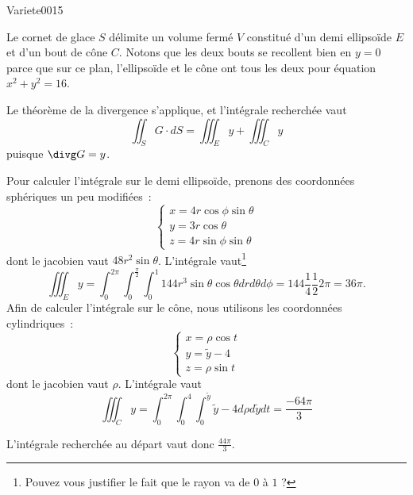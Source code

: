 
\begin{corrige}{Variete0015}

Le cornet de glace $S$ délimite un volume fermé $V$ constitué d'un demi ellipsoïde $E$ et d'un bout de cône $C$. Notons que les deux bouts se recollent bien en $y=0$ parce que sur ce plan, l'ellipsoïde et le cône ont tous les deux pour équation  $x^2+y^2=16$.

Le théorème de la divergence s'applique, et l'intégrale recherchée vaut
\begin{equation*}
  \iint_S G \cdot d S = \iiint_E y + \iiint_C y
\end{equation*}
puisque $\divg G = y$.

Pour calculer l'intégrale sur le demi ellipsoïde, prenons des coordonnées sphériques un peu modifiées~:
\begin{equation*}
  \begin{cases}
    x = 4 r \cos \phi \sin \theta\\
    y = 3 r \cos \theta\\
    z = 4 r \sin \phi \sin \theta
  \end{cases}
\end{equation*}
dont le jacobien vaut $48 r^2 \sin \theta$. L'intégrale vaut\footnote{Pouvez vous justifier le fait que le rayon va de $0$ à $1$ ?}
\begin{equation*}
  \iiint_E y = %
  \int_0^{2\pi} \int_0^{\frac\pi2} \int_0^1 144 r^3 \sin\theta\cos\theta%
  d r d \theta d \phi =%
  144 \frac 14 \frac 12 2 \pi = 36 \pi.
\end{equation*}
Afin de calculer l'intégrale sur le cône, nous utilisons les coordonnées cylindriques~:
\begin{equation*}
  \begin{cases}
    x = \rho \cos t\\
    y = \tilde y - 4\\
    z = \rho \sin t
  \end{cases}
\end{equation*}
dont le jacobien vaut $\rho$. L'intégrale vaut
\begin{equation*}
  \iiint_C y = \int_0^{2\pi} \int_0^4 \int_0^{\tilde y} \tilde y - 4
  d\rho d\tilde yd t = \frac{- 64 \pi}{3}
\end{equation*}

L'intégrale recherchée au départ vaut donc \begin{math}
  \frac {44 \pi}3
\end{math}.

\end{corrige}

